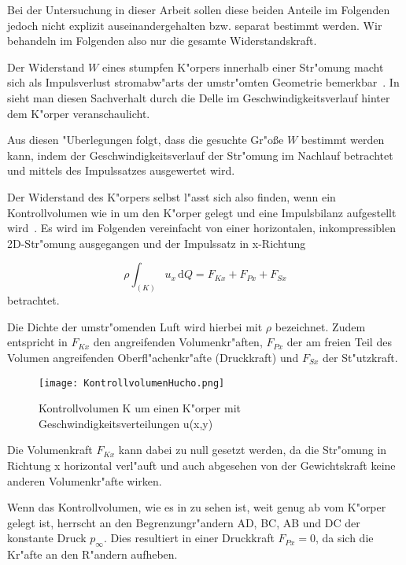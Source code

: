 Bei der Untersuchung in dieser Arbeit sollen diese beiden Anteile im Folgenden jedoch nicht explizit auseinandergehalten bzw. separat bestimmt werden. Wir behandeln im Folgenden also nur die gesamte Widerstandskraft.

Der Widerstand $W$ eines stumpfen K"orpers innerhalb einer Str"omung macht sich als Impulsverlust stromabw"arts der umstr"omten Geometrie bemerkbar~\cite{Hucho.2011}. In  sieht man diesen Sachverhalt durch die Delle im Geschwindigkeitsverlauf hinter dem K"orper veranschaulicht. %

Aus diesen "Uberlegungen folgt, dass die gesuchte Gr"o\ss{}e $W$ bestimmt werden kann, indem der Geschwindigkeitsverlauf der Str"omung im Nachlauf betrachtet und mittels des Impulssatzes ausgewertet wird. 

Der Widerstand des K"orpers selbst l"asst sich also finden, wenn ein Kontrollvolumen wie in  um den K"orper gelegt und eine Impulsbilanz aufgestellt wird~\cite{Hucho.2011}. Es wird im Folgenden vereinfacht von einer horizontalen, inkompressiblen 2D-Str"omung ausgegangen und der Impulssatz in x-Richtung

\begin{equation}
	\label{eq:impulssatz_allg}
	\rho \int_{(K)} u_x \, \mathrm{d}Q = F_{Kx} + F_{Px} + F_{Sx}
\end{equation}
betrachtet.

Die Dichte der umstr"omenden Luft wird hierbei mit $\rho$ bezeichnet.
Zudem entspricht in  $F_{Kx}$ den angreifenden Volumenkr"aften, $F_{Px}$ der am freien Teil des Volumen angreifenden Oberfl"achenkr"afte (Druckkraft) und $F_{Sx}$ der St"utzkraft.

\begin{figure}[h]
	\centering
	\texttt{[image: KontrollvolumenHucho.png]}
	\caption{Kontrollvolumen K um einen K"orper mit Geschwindigkeitsverteilungen u(x,y)~\cite{Hucho.2011}}
	\label{fig:HuchoKV}
\end{figure}

Die Volumenkraft $F_{Kx}$ kann dabei zu null gesetzt werden, da die Str"omung in Richtung x horizontal verl"auft und auch abgesehen von der Gewichtskraft keine anderen Volumenkr"afte wirken.

Wenn das Kontrollvolumen, wie es in  zu sehen ist, weit genug ab vom K"orper gelegt ist, herrscht an den Begrenzungr"andern AD, BC, AB und DC der konstante Druck $p_{\infty}$.
Dies resultiert in einer Druckkraft $F_{Px} = 0$, da sich die Kr"afte an den R"andern aufheben.

